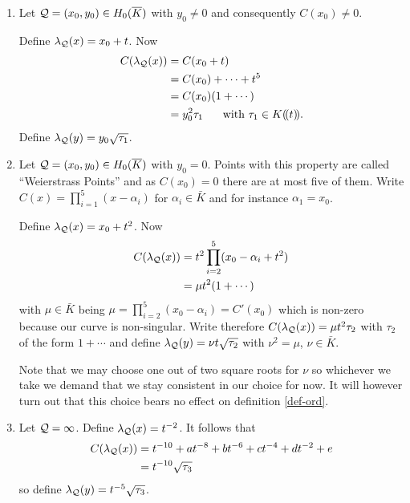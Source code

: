 \documentclass[english,11pt,a4paper]{article}
\begin{document}
\newpage

\begin{defin}\label{def-lambda}
  \begin{enumerate}[1.]
    \item Let $\mathcal{Q} =(x_0,y_0) \in H_0(\overline K)$ with $y_0 \neq 0$ and consequently $C(x_0)\neq 0$.

    Define $\lambda_{\mathcal{Q}}(x) = x_0 + t$. Now
    \begin{align*}
      C(\lpx) &= C(x_0+t)\\
              &= C(x_0)+ \cdots + t^5\\
              &= C(x_0)(1 + \cdots)\\ %
              &= y_0^2 \tau_1 \text{\hspace{5mm} with } \tau_1 \in K (\! (t)\! ).
    \end{align*}
    Define $\lambda_{\mathcal{Q}}(y) = y_0 \sqrt{\tau_1}$.

    \item Let $\mathcal{Q} =(x_0,y_0) \in H_0(\overline K)$ with $y_0 = 0$. Points with this property are called ``Weierstrass Points'' and as $C(x_0)=0$ there are at most five of them. Write $C(x)=\prod_{i=1}^5 (x-\alpha_i)$ for $\alpha_i \in \bar K$ and for instance $\alpha_1 = x_0$.

    Define $\lambda_{\mathcal{Q}}(x) = x_0 + t^2$. Now
    \begin{align*}
      C(\lambda_{\mathcal{Q}}(x)) &= t^2 \prod_{i=2}^5 (x_0 -\alpha_i + t^2) \\
              &= \mu t^2 (1 + \cdots)
    \end{align*}
    with $\mu \in \bar K$ being $\mu = \prod_{i=2}^5 (x_0 - \alpha_i) = C'(x_0)$ which is non-zero because our curve is non-singular. Write therefore $C(\lambda_{\mathcal{Q}}(x)) = \mu t^2 \tau_2$ with $\tau_2$ of the form $1 + \cdots$ and define $\lambda_{\mathcal{Q}}(y) = \nu t \sqrt{\tau_2}$ with $\nu^2 = \mu$, $\nu \in  \bar K$.

    Note that we may choose one out of two square roots for $\nu$ so whichever we take we demand that we stay consistent in our choice for now. It will however turn out that this choice bears no effect on definition \ref{def-ord}.

    \item Let $\mathcal{Q} = \infty$. Define $\lambda_{\mathcal{Q}}(x) = t^{-2}$. It follows that
    \begin{align*}
      C(\lambda_{\mathcal{Q}}(x)) &= t^{-10} + at^{-8} + bt^{-6}
                        + ct^{-4}    + dt^{-2} + e\\
                       &= t^{-10} \sqrt{\tau_3}
    \end{align*}
    so define $\lambda_{\mathcal{Q}}(y) = t^{-5} \sqrt{\tau_3}$.
  \end{enumerate}
\end{defin}
\end{document}
